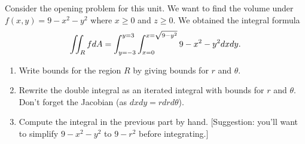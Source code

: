 \begin{problem}%
Consider the opening problem for this unit.  We want to find the volume under $f(x,y)=9-x^2-y^2$ where $x\geq0$ and $z\geq 0$.  We obtained the integral formula 
$$\iint_R f dA = \displaystyle\int_{y=-3}^{y=3} \int_{x=0}^{x=\sqrt{9-y^2}}9-x^2-y^2 dx dy.$$
\begin{enumerate}
 \item Write bounds for the region $R$ by giving bounds for $r$ and $\theta$.
 \item Rewrite the double integral as an iterated integral with bounds for $r$ and $\theta$. Don't forget the Jacobian (as $dxdy=rdrd\theta$). 
 \item Compute the integral in the previous part by hand. [Suggestion: you'll want to simplify $9-x^2-y^2$ to $9-r^2$ before integrating.]
\end{enumerate}
\end{problem}


